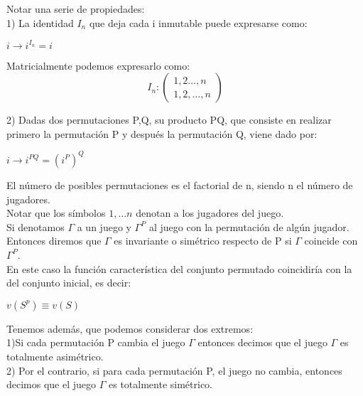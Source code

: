 \documentclass[10pt,a4paper]{book}
\begin{document}
Notar una serie de propiedades:\\

1) La identidad $I_n$ que deja cada i inmutable puede expresarse como:\\
\begin{center}

$i \rightarrow i^{I_n} =i $

\end{center}

Matricialmente podemos expresarlo como:\\

\begin{equation}
	I_n:\begin{pmatrix}
		1, 2 \ldots, n \\
		1, 2, \ldots ,n
	\end{pmatrix}
\end{equation}

2) Dadas dos permutaciones P,Q, su producto PQ, que consiste en realizar primero la permutación P y después la permutación Q, viene dado por:\\

\begin{center}

$i \rightarrow i^{PQ} =(i^P)^Q $

\end{center}

El número de posibles permutaciones es el factorial de n, siendo n el número de jugadores.\\

Notar que los símbolos $1, \ldots n$ denotan a los jugadores del juego.\\

Si denotamos $\Gamma$ a un juego y $\Gamma^P$ al juego con la permutación de algún jugador.\\
Entonces diremos que $\Gamma$ es invariante o simétrico respecto de P si $\Gamma$ coincide con $\Gamma^P$. \\
En este caso la función característica del conjunto permutado coincidiría con la del conjunto inicial, es decir:\\

\begin{center}

$v(S^p) \equiv v(S)$

\end{center}

Tenemos además, que podemos considerar dos extremos:\\
1)Si cada permutación P cambia el juego $\Gamma$ entonces decimos que el juego $\Gamma$ es totalmente asimétrico. \\
2) Por el contrario, si para cada permutación P, el juego no cambia, entonces decimos que el juego $\Gamma$ es totalmente simétrico.\\
\end{document}
